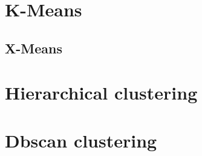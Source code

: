 \documentclass[10pt,a4paper]{report}
\begin{document}
\section{K-Means}

\subsection{X-Means}

\section{Hierarchical clustering}

\section{Dbscan clustering}
\end{document}
